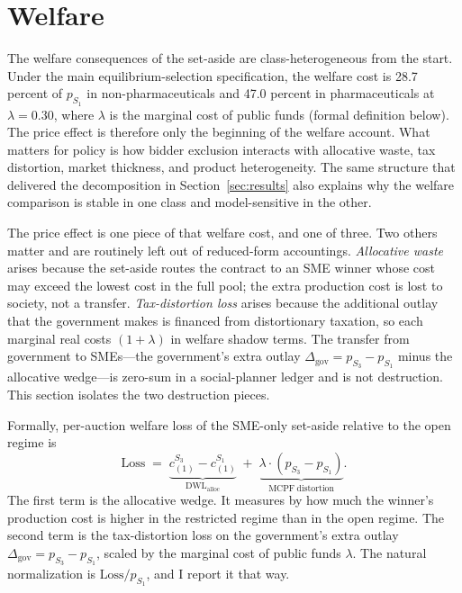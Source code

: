 \section{Welfare}\label{sec:welfare}

The welfare consequences of the set-aside are class-heterogeneous from the start. Under the main equilibrium-selection specification, the welfare cost is 28.7 percent of $p_{S_1}$ in non-pharmaceuticals and 47.0 percent in pharmaceuticals at $\lambda = 0.30$, where $\lambda$ is the marginal cost of public funds (formal definition below). The price effect is therefore only the beginning of the welfare account. What matters for policy is how bidder exclusion interacts with allocative waste, tax distortion, market thickness, and product heterogeneity. The same structure that delivered the decomposition in Section~\ref{sec:results} also explains why the welfare comparison is stable in one class and model-sensitive in the other.

The price effect is one piece of that welfare cost, and one of three. Two others matter and are routinely left out of reduced-form accountings. \emph{Allocative waste} arises because the set-aside routes the contract to an SME winner whose cost may exceed the lowest cost in the full pool; the extra production cost is lost to society, not a transfer. \emph{Tax-distortion loss} arises because the additional outlay that the government makes is financed from distortionary taxation, so each marginal real costs $(1+\lambda)$ in welfare shadow terms. The transfer from government to SMEs---the government's extra outlay $\Delta_{\text{gov}} = p_{S_3} - p_{S_1}$ minus the allocative wedge---is zero-sum in a social-planner ledger and is not destruction. This section isolates the two destruction pieces.

Formally, per-auction welfare loss of the SME-only set-aside relative to the open regime is
\begin{equation}\label{eq:welfare}
\mathrm{Loss} \;=\; \underbrace{c_{(1)}^{S_3} - c_{(1)}^{S_1}}_{\mathrm{DWL}_{\text{alloc}}}
\;+\; \underbrace{\lambda \cdot (p_{S_3} - p_{S_1})}_{\mathrm{MCPF\ distortion}}.
\end{equation}
The first term is the allocative wedge. It measures by how much the winner's production cost is higher in the restricted regime than in the open regime. The second term is the tax-distortion loss on the government's extra outlay $\Delta_{\text{gov}} = p_{S_3} - p_{S_1}$, scaled by the marginal cost of public funds $\lambda$. The natural normalization is $\mathrm{Loss} / p_{S_1}$, and I report it that way.

